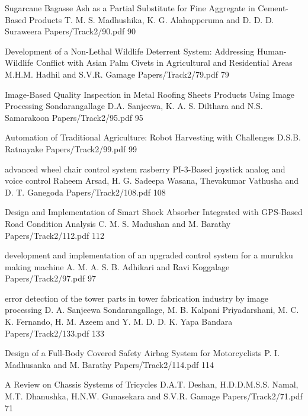 \addpaper
{Sugarcane Bagasse Ash as a Partial Substitute for Fine Aggregate in Cement-Based Products}
{T. M. S. Madhushika, K. G. Alahapperuma and D. D. D. Suraweera}
{Papers/Track2/90.pdf}
{90}



\addpaper
{Development of a Non-Lethal Wildlife Deterrent System: Addressing Human-Wildlife Conflict with Asian Palm Civets in Agricultural and Residential Areas}
{M.H.M. Hadhil and S.V.R. Gamage}
{Papers/Track2/79.pdf}
{79}



    \addpaper
{Image-Based Quality Inspection in Metal Roofing Sheets Products Using Image Processing}
 {Sondarangallage D.A. Sanjeewa, K. A. S. Dilthara and N.S. Samarakoon} 
 {Papers/Track2/95.pdf}
   {95} 


    \addpaper
{Automation of Traditional Agriculture: Robot Harvesting with Challenges}
 {D.S.B. Ratnayake} 
 {Papers/Track2/99.pdf}
   {99} 


   \addpaper
{advanced wheel chair control system rasberry PI-3-Based joystick analog and voice control}
 {Raheem Arsad, H. G. Sadeepa Wasana, Thevakumar Vathusha and D. T. Ganegoda} 
 {Papers/Track2/108.pdf}
   {108} 


\addpaper
{Design and Implementation of Smart Shock Absorber Integrated with GPS-Based Road Condition Analysis}
{C. M. S. Madushan and M. Barathy}
{Papers/Track2/112.pdf}
{112}



\addpaper
{development and implementation of an upgraded
control system for a murukku making machine}
{A. M. A. S. B. Adhikari and Ravi Koggalage}
{Papers/Track2/97.pdf}
{97}




   \addpaper
{error detection of the tower parts in tower fabrication industry by image processing}
 {D. A. Sanjeewa Sondarangallage, M. B. Kalpani Priyadarshani,
M. C. K. Fernando, H. M. Azeem and Y. M. D. D. K. Yapa Bandara} 
 {Papers/Track2/133.pdf}
   {133} 





\addpaper
{Design of a Full-Body Covered Safety Airbag System for Motorcyclists}
{P. I. Madhusanka and M. Barathy}
{Papers/Track2/114.pdf}
{114}




   \addpaper
{A Review on Chassis Systems of Tricycles}
 {D.A.T. Deshan, H.D.D.M.S.S. Namal, M.T. Dhanushka, H.N.W. Gunasekara
and S.V.R. Gamage} 
 {Papers/Track2/71.pdf}
   {71} 
























